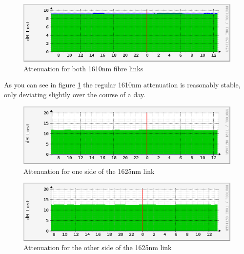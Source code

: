 \documentclass{article}
\begin{document}
\paragraph{}
\begin{figure}[h!]
\centerline{\includegraphics[scale=0.7]{images/1610.png}}
\caption{Attenuation for both 1610nm fibre links}
\label{fig:1610}
\end{figure}
As you can see in figure \ref{fig:1610} the regular 1610nm attenuation is reasonably stable, only deviating slightly over the course of a day.
\begin{figure}[h!]
\centerline{\includegraphics[scale=0.7]{images/1625-1.png}}
\caption{Attenuation for one side of the 1625nm link}
\label{fig:1625-1}
\end{figure}
\begin{figure}[h!]
\centerline{\includegraphics[scale=0.7]{images/1625-2.png}}
\caption{Attenuation for the other side of the 1625nm link}
\label{fig:1625-2}
\end{figure}
\end{document}
